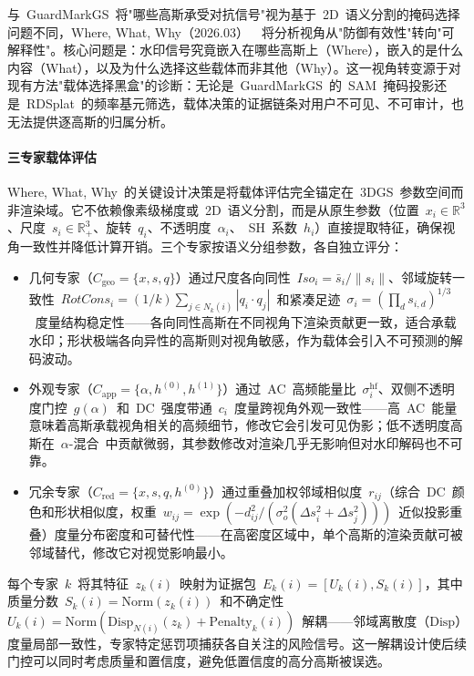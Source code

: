 与~GuardMarkGS~将"哪些高斯承受对抗信号"视为基于~2D~语义分割的掩码选择问题不同，Where, What, Why（2026.03）~\cite{2603_08809}~将分析视角从"防御有效性"转向"可解释性"。核心问题是：水印信号究竟嵌入在哪些高斯上（Where），嵌入的是什么内容（What），以及为什么选择这些载体而非其他（Why）。这一视角转变源于对现有方法"载体选择黑盒"的诊断：无论是~GuardMarkGS~的~SAM~掩码投影还是~RDSplat~的频率基元筛选，载体决策的证据链条对用户不可见、不可审计，也无法提供逐高斯的归属分析。

\paragraph{三专家载体评估}
Where, What, Why~的关键设计决策是将载体评估完全锚定在~3DGS~参数空间而非渲染域。它不依赖像素级梯度或~2D~语义分割，而是从原生参数（位置~$x_i \in \mathbb{R}^3$、尺度~$s_i \in \mathbb{R}_+^3$、旋转~$q_i$、不透明度~$\alpha_i$、~SH~系数~$h_i$）直接提取特征，确保视角一致性并降低计算开销。三个专家按语义分组参数，各自独立评分：
\begin{itemize}
\item 几何专家（$C_{\mathrm{geo}} = \{x, s, q\}$）通过尺度各向同性~$Iso_i = \bar{s}_i / \|s_i\|$、邻域旋转一致性~$RotCons_i = (1/k)\sum_{j \in N_k(i)}|q_i \cdot q_j|$~和紧凑足迹~$\sigma_i = (\prod_{d} s_{i,d})^{1/3}$~度量结构稳定性——各向同性高斯在不同视角下渲染贡献更一致，适合承载水印；形状极端各向异性的高斯则对视角敏感，作为载体会引入不可预测的解码波动。
\item 外观专家（$C_{\mathrm{app}} = \{\alpha, h^{(0)}, h^{(1)}\}$）通过~AC~高频能量比~$\sigma_i^{\mathrm{hf}}$、双侧不透明度门控~$g(\alpha)$~和~DC~强度带通~$c_i$~度量跨视角外观一致性——高~AC~能量意味着高斯承载视角相关的高频细节，修改它会引发可见伪影；低不透明度高斯在~$\alpha$-混合~中贡献微弱，其参数修改对渲染几乎无影响但对水印解码也不可靠。
\item 冗余专家（$C_{\mathrm{red}} = \{x, s, q, h^{(0)}\}$）通过重叠加权邻域相似度~$r_{ij}$（综合~DC~颜色和形状相似度，权重~$w_{ij} = \exp(-d_{ij}^2 / (\sigma_o^2(\Delta s_i^2 + \Delta s_j^2)))$~近似投影重叠）度量分布密度和可替代性——在高密度区域中，单个高斯的渲染贡献可被邻域替代，修改它对视觉影响最小。
\end{itemize}
每个专家~$k$~将其特征~$z_k(i)$~映射为证据包~$E_k(i) = [U_k(i), S_k(i)]$，其中质量分数~$S_k(i) = \mathrm{Norm}(z_k(i))$~和不确定性~$U_k(i) = \mathrm{Norm}(\mathrm{Disp}_{N(i)}(z_k) + \mathrm{Penalty}_k(i))$~解耦——邻域离散度（$\mathrm{Disp}$）度量局部一致性，专家特定惩罚项捕获各自关注的风险信号。这一解耦设计使后续门控可以同时考虑质量和置信度，避免低置信度的高分高斯被误选。

